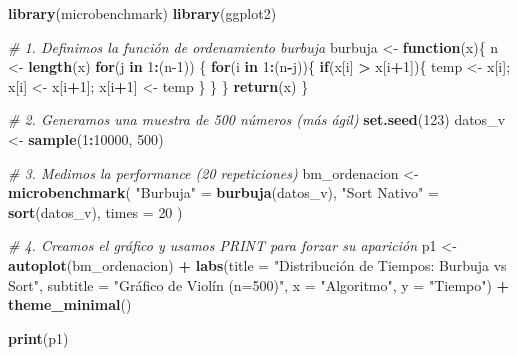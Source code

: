 \documentclass[]{llncs}
\newenvironment{Shaded}{\begin{snugshade}}{\end{snugshade}}
\newcommand{\AttributeTok}[1]{\textcolor[rgb]{0.13,0.29,0.53}{#1}}
\newcommand{\CommentTok}[1]{\textcolor[rgb]{0.56,0.35,0.01}{\textit{#1}}}
\newcommand{\ControlFlowTok}[1]{\textcolor[rgb]{0.13,0.29,0.53}{\textbf{#1}}}
\newcommand{\DecValTok}[1]{\textcolor[rgb]{0.00,0.00,0.81}{#1}}
\newcommand{\FunctionTok}[1]{\textcolor[rgb]{0.13,0.29,0.53}{\textbf{#1}}}
\newcommand{\NormalTok}[1]{#1}
\newcommand{\OtherTok}[1]{\textcolor[rgb]{0.56,0.35,0.01}{#1}}
\newcommand{\SpecialCharTok}[1]{\textcolor[rgb]{0.81,0.36,0.00}{\textbf{#1}}}
\newcommand{\StringTok}[1]{\textcolor[rgb]{0.31,0.60,0.02}{#1}}
\begin{document}
\begin{Shaded}
\begin{Highlighting}[]
\FunctionTok{library}\NormalTok{(microbenchmark)}
\FunctionTok{library}\NormalTok{(ggplot2)}

\CommentTok{\# 1. Definimos la función de ordenamiento burbuja}
\NormalTok{burbuja }\OtherTok{\textless{}{-}} \ControlFlowTok{function}\NormalTok{(x)\{}
\NormalTok{  n }\OtherTok{\textless{}{-}} \FunctionTok{length}\NormalTok{(x)}
  \ControlFlowTok{for}\NormalTok{(j }\ControlFlowTok{in} \DecValTok{1}\SpecialCharTok{:}\NormalTok{(n}\DecValTok{{-}1}\NormalTok{)) \{}
    \ControlFlowTok{for}\NormalTok{(i }\ControlFlowTok{in} \DecValTok{1}\SpecialCharTok{:}\NormalTok{(n}\SpecialCharTok{{-}}\NormalTok{j))\{}
      \ControlFlowTok{if}\NormalTok{(x[i] }\SpecialCharTok{\textgreater{}}\NormalTok{ x[i}\SpecialCharTok{+}\DecValTok{1}\NormalTok{])\{}
\NormalTok{        temp }\OtherTok{\textless{}{-}}\NormalTok{ x[i]; x[i] }\OtherTok{\textless{}{-}}\NormalTok{ x[i}\SpecialCharTok{+}\DecValTok{1}\NormalTok{]; x[i}\SpecialCharTok{+}\DecValTok{1}\NormalTok{] }\OtherTok{\textless{}{-}}\NormalTok{ temp}
\NormalTok{      \}}
\NormalTok{    \}}
\NormalTok{  \}}
  \FunctionTok{return}\NormalTok{(x)}
\NormalTok{\}}

\CommentTok{\# 2. Generamos una muestra de 500 números (más ágil)}
\FunctionTok{set.seed}\NormalTok{(}\DecValTok{123}\NormalTok{)}
\NormalTok{datos\_v }\OtherTok{\textless{}{-}} \FunctionTok{sample}\NormalTok{(}\DecValTok{1}\SpecialCharTok{:}\DecValTok{10000}\NormalTok{, }\DecValTok{500}\NormalTok{)}

\CommentTok{\# 3. Medimos la performance (20 repeticiones)}
\NormalTok{bm\_ordenacion }\OtherTok{\textless{}{-}} \FunctionTok{microbenchmark}\NormalTok{(}
  \StringTok{"Burbuja"} \OtherTok{=} \FunctionTok{burbuja}\NormalTok{(datos\_v),}
  \StringTok{"Sort Nativo"} \OtherTok{=} \FunctionTok{sort}\NormalTok{(datos\_v),}
  \AttributeTok{times =} \DecValTok{20}
\NormalTok{)}

\CommentTok{\# 4. Creamos el gráfico y usamos PRINT para forzar su aparición}
\NormalTok{p1 }\OtherTok{\textless{}{-}} \FunctionTok{autoplot}\NormalTok{(bm\_ordenacion) }\SpecialCharTok{+} 
  \FunctionTok{labs}\NormalTok{(}\AttributeTok{title =} \StringTok{"Distribución de Tiempos: Burbuja vs Sort"}\NormalTok{,}
       \AttributeTok{subtitle =} \StringTok{"Gráfico de Violín (n=500)"}\NormalTok{,}
       \AttributeTok{x =} \StringTok{"Algoritmo"}\NormalTok{, }\AttributeTok{y =} \StringTok{"Tiempo"}\NormalTok{) }\SpecialCharTok{+}
  \FunctionTok{theme\_minimal}\NormalTok{()}

\FunctionTok{print}\NormalTok{(p1)}
\end{Highlighting}
\end{Shaded}
\end{document}
